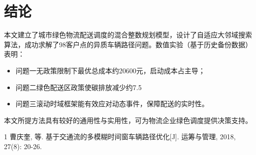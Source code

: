 \documentclass[11pt,a4paper]{article}
\begin{document}
\section{结论}
本文建立了城市绿色物流配送调度的混合整数规划模型，设计了自适应大邻域搜索算法，成功求解了98客户点的异质车辆路径问题。数值实验（基于历史备份数据）表明：
\begin{itemize}
    \item 问题一无政策限制下最优总成本约20600元，启动成本占主导；
    \item 问题二绿色配送区政策使碳排放减少约7.5%
    \item 问题三滚动时域框架能有效应对动态事件，保障配送的实时性。
\end{itemize}

本文所提方法具有较好的通用性与实用性，可为物流企业绿色调度提供决策支持。

\begin{thebibliography}{1}
 曹庆奎, 等. 基于交通流的多模糊时间窗车辆路径优化[J]. 运筹与管理, 2018, 27(8): 20-26.
\end{thebibliography}
\end{document}
